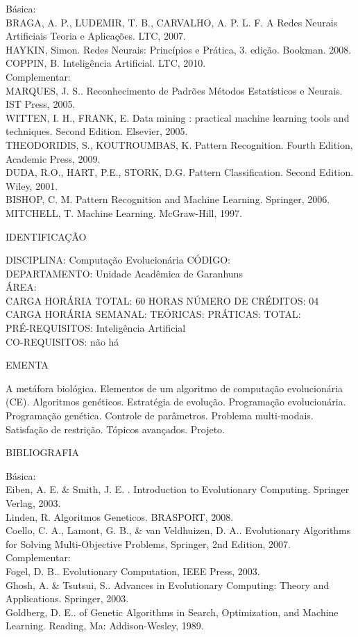 \documentclass[
	12pt,				%
	openright,			%
  oneside,     %
	a4paper,			%
	chapter=TITLE,		%
	english,			%
	french,				%
	spanish,			%
	brazil				%
	]{abntex2}
\begin{document}
\begin{apendicesenv}
Básica:\\
BRAGA, A. P., LUDEMIR, T. B., CARVALHO, A. P. L. F. A Redes Neurais Artificiais  Teoria e Aplicações. LTC, 2007.\\
HAYKIN, Simon. Redes Neurais: Princípios e Prática, 3. edição. Bookman.
2008.\\
COPPIN, B. Inteligência Artificial. LTC, 2010.\\
Complementar:\\
MARQUES, J. S.. Reconhecimento de Padrões  Métodos Estatísticos e Neurais. IST Press, 2005.\\
WITTEN, I. H., FRANK, E. Data mining : practical machine learning tools and techniques. Second Edition. Elsevier, 2005.\\
THEODORIDIS, S., KOUTROUMBAS, K. Pattern Recognition. Fourth Edition, Academic Press, 2009.\\
DUDA, R.O., HART, P.E., STORK, D.G. Pattern Classification. Second Edition. Wiley, 2001.\\
BISHOP, C. M. Pattern Recognition and Machine Learning. Springer, 2006.\\
MITCHELL, T. Machine Learning. McGraw-Hill, 1997.

\newpage IDENTIFICAÇÃO

DISCIPLINA: Computação Evolucionária CÓDIGO:\\ 
DEPARTAMENTO: Unidade Acadêmica de Garanhuns\\
ÁREA: \\
CARGA HORÁRIA TOTAL: 60 HORAS NÚMERO DE CRÉDITOS: 04\\
CARGA HORÁRIA SEMANAL: TEÓRICAS: PRÁTICAS: TOTAL: \\
PRÉ-REQUISITOS: Inteligência Artificial\\
CO-REQUISITOS: não há

EMENTA 

A metáfora biológica. Elementos de um algoritmo de computação
evolucionária (CE). Algoritmos genéticos. Estratégia de evolução. Programação evolucionária. Programação genética. Controle de
parâmetros. Problema multi-modais. Satisfação de restrição. Tópicos avançados. Projeto.

BIBLIOGRAFIA 

Básica:\\
Eiben, A. E. \& Smith, J. E. . Introduction to Evolutionary Computing.
Springer Verlag, 2003.\\
Linden, R. Algoritmos Geneticos. BRASPORT, 2008.\\
Coello, C. A., Lamont, G. B., \& van Veldhuizen, D. A.. Evolutionary
Algorithms for Solving Multi-Objective Problems, Springer, 2nd Edition,
2007.\\
Complementar:\\
Fogel, D. B.. Evolutionary Computation, IEEE Press, 2003.\\
Ghosh, A. \& Tsutsui, S.. Advances in Evolutionary Computing: Theory and
Applications. Springer, 2003.\\
Goldberg, D. E.. of Genetic Algorithms in Search, Optimization, and
Machine Learning. Reading, Ma: Addison-Wesley, 1989.


\end{apendicesenv}
\end{document}
